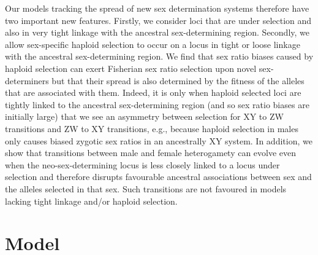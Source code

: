 \documentclass[12pt]{article}
\begin{document}
Our models tracking the spread of new sex determination systems therefore have two important new features. 
Firstly, we consider loci that are under selection and also in very tight linkage with the ancestral sex-determining region. 
Secondly, we allow sex-specific haploid selection to occur on a locus in tight or loose linkage with the ancestral sex-determining region. 
We find that sex ratio biases caused by haploid selection can exert Fisherian sex ratio selection upon novel sex-determiners but that their spread is also determined by the fitness of the alleles that are associated with them. 
Indeed, it is only when haploid selected loci are tightly linked to the ancestral sex-determining region (and so sex ratio biases are initially large) that we see an asymmetry between selection for XY to ZW transitions and ZW to XY transitions, e.g., because haploid selection in males only causes biased zygotic sex ratios in an ancestrally XY system.
In addition, we show that transitions between male and female heterogamety can evolve even when the neo-sex-determining locus is less closely linked to a locus under selection and therefore disrupts favourable ancestral associations between sex and the alleles selected in that sex.
Such transitions are not favoured in models lacking tight linkage and/or haploid selection. 

\section*{Model}
\end{document}
